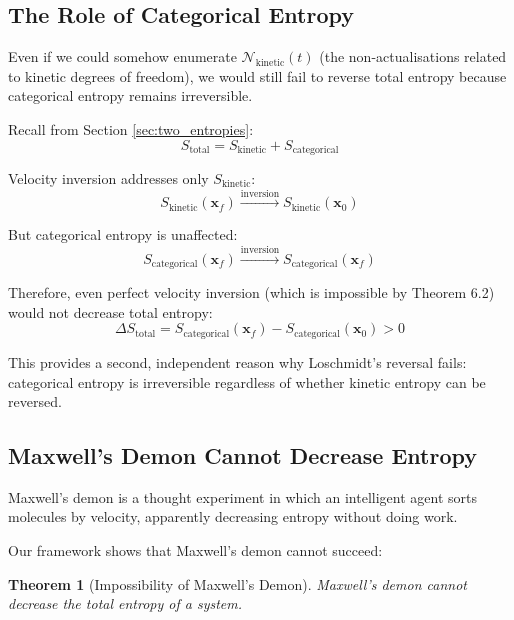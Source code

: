 \documentclass[twocolumn,10pt]{article}
\newtheorem{theorem}{Theorem}[section]
\theoremstyle{definition}
\theoremstyle{remark}
\begin{document}
\subsection{The Role of Categorical Entropy}

Even if we could somehow enumerate $\mathcal{N}_{\text{kinetic}}(t)$ (the non-actualisations related to kinetic degrees of freedom), we would still fail to reverse total entropy because categorical entropy remains irreversible.

Recall from Section \ref{sec:two_entropies}:
$$
S_{\text{total}} = S_{\text{kinetic}} + S_{\text{categorical}}
$$

Velocity inversion addresses only $S_{\text{kinetic}}$:
$$
S_{\text{kinetic}}(\mathbf{x}_f) \xrightarrow{\text{inversion}} S_{\text{kinetic}}(\mathbf{x}_0)
$$

But categorical entropy is unaffected:
$$
S_{\text{categorical}}(\mathbf{x}_f) \xrightarrow{\text{inversion}} S_{\text{categorical}}(\mathbf{x}_f)
$$

Therefore, even perfect velocity inversion (which is impossible by Theorem 6.2) would not decrease total entropy:
$$
\Delta S_{\text{total}} = S_{\text{categorical}}(\mathbf{x}_f) - S_{\text{categorical}}(\mathbf{x}_0) > 0
$$

This provides a second, independent reason why Loschmidt's reversal fails: categorical entropy is irreversible regardless of whether kinetic entropy can be reversed.

\subsection{Maxwell's Demon Cannot Decrease Entropy}

Maxwell's demon \cite{maxwell1871} is a thought experiment in which an intelligent agent sorts molecules by velocity, apparently decreasing entropy without doing work.

Our framework shows that Maxwell's demon cannot succeed:

\begin{theorem}[Impossibility of Maxwell's Demon]
Maxwell's demon cannot decrease the total entropy of a system.
\end{theorem}
\end{document}
